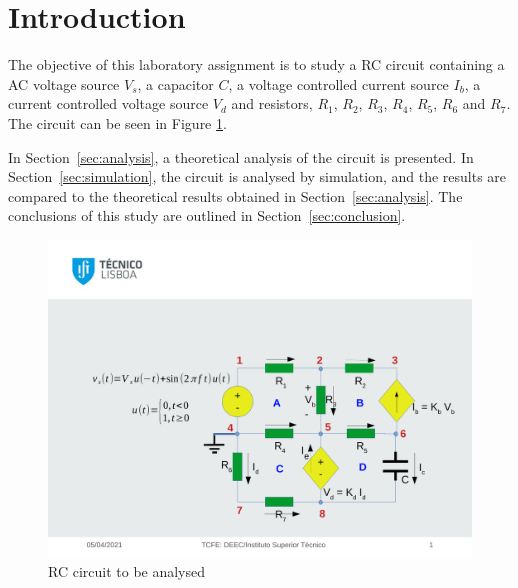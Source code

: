 \section{Introduction}
\label{sec:introduction}

The objective of this laboratory assignment is to study a RC circuit containing a
AC voltage source $V_s$, a capacitor $C$, a voltage controlled current
source $I_b$, a current controlled voltage source $V_d$ and resistors,
$R_1$, $R_2$, $R_3$, $R_4$, $R_5$, $R_6$ and $R_7$. The circuit can be seen in Figure \ref{fig:t2}.

In Section~\ref{sec:analysis}, a theoretical analysis of the circuit is
presented. In Section~\ref{sec:simulation}, the circuit is analysed by
simulation, and the results are compared to the theoretical results obtained in
Section~\ref{sec:analysis}. The conclusions of this study are outlined in
Section~\ref{sec:conclusion}.

\begin{figure}[H] \centering
\includegraphics[width=1\linewidth]{t2.pdf}
\caption{RC circuit to be analysed}
\label{fig:t2}
\end{figure}

